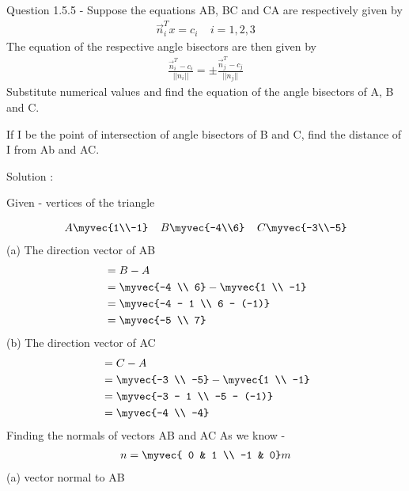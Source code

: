 \documentclass[journal,12pt,twocolumn]{IEEEtran}
\theoremstyle{remark}
\begin{document}
Question 1.5.5 - Suppose the equations AB, BC and CA are respectively given by
\begin{align}
\vec{n}_{i}^{T}x=c_{i} \;\; \; \; i=1 , 2 , 3
\end{align}
The equation of the respective angle bisectors are then given by
\begin{align}
\frac{\vec{n}_{i}^{T} - c_{i}}{||n_{i}||} = \pm \frac{\vec{n}_{j}^{T} - c_{j}}{||n_{j}||}
\end{align}
Substitute numerical values and find the equation of the angle bisectors of A, B and C.

If I be the point of intersection of angle bisectors of B and C, find the distance of I from Ab and AC.

Solution :

Given - vertices of the triangle

\begin{align}
A \myvec{1\\-1} \; \; \; \; B\myvec{-4\\6} \; \; \; \; C\myvec{-3\\-5}
\end{align}
(a) The direction vector of AB
\begin{align}
&= B - A \\
&= \myvec{-4 \\ 6} - \myvec{1 \\ -1}\\
&= \myvec{-4 - 1 \\ 6 - (-1)} \\
&= \myvec{-5 \\ 7}
\end{align}
(b) The direction vector of AC
\begin{align}
&= C - A \\
&= \myvec{-3 \\ -5} - \myvec{1 \\ -1}\\
&= \myvec{-3 - 1 \\ -5 - (-1)} \\
&= \myvec{-4 \\ -4}
\end{align}
Finding the normals of vectors AB and AC
As we know -
\begin{align}
n=\myvec{ 0 & 1 \\ -1 & 0} m
\end{align}
(a) vector normal to AB
\end{document}
